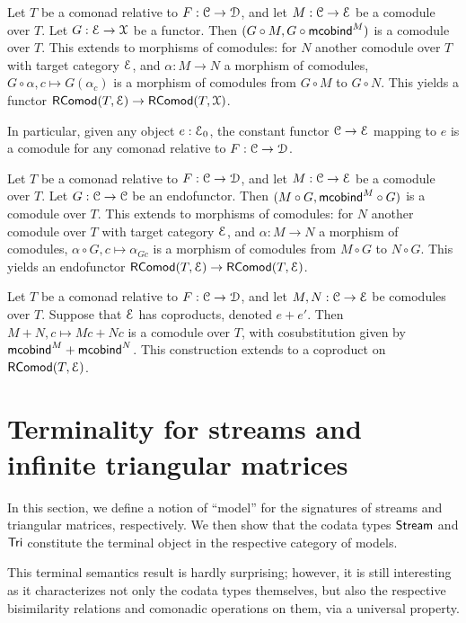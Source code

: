 \documentclass[a4paper,USenglish]{lipics}
\begin{document}
\begin{lem}
Let $T$ be a comonad relative to $F : {\mathcal{C}} \to \mathcal{D}$, and let $M : {\mathcal{C}} \to \mathcal{E}$ be a comodule over $T$.
Let $G : \mathcal{E} \to \mathcal{X}$ be a functor.
Then $(G \circ M, G\circ \mathsf{mcobind}^M)$ is a comodule over $T$.
This extends to morphisms of comodules: for $N$ another comodule over $T$ with target category $\mathcal{E}$, and $\alpha : M \to N$ a morphism of comodules,
$G \circ \alpha, c \mapsto G(\alpha_c)$
is a morphism of comodules from $G \circ M$ to $G \circ N$.
This yields a functor
$\mathsf{RComod}(T,\mathcal{E}) \to \mathsf{RComod}(T,\mathcal{X})$. 
\end{lem}

In particular, given any object $e:\mathcal{E}_0$, the constant functor ${\mathcal{C}}\to\mathcal{E}$ mapping to $e$ is a comodule for any comonad relative to $F:{\mathcal{C}}\to\mathcal{D}$.

\begin{lem}
Let $T$ be a comonad relative to $F : {\mathcal{C}} \to \mathcal{D}$, and let $M : {\mathcal{C}} \to \mathcal{E}$ be a comodule over $T$.
Let $G : {\mathcal{C}} \to {\mathcal{C}}$ be an endofunctor.
Then $(M \circ G, \mathsf{mcobind}^M \circ G)$ is a comodule over $T$.
This extends to morphisms of comodules: for $N$ another comodule over $T$ with target category $\mathcal{E}$, and $\alpha : M \to N$ a morphism of comodules,
$\alpha \circ G, c \mapsto \alpha_{Gc}$
is a morphism of comodules from $M \circ G$ to $N \circ G$.
This yields an endofunctor
$\mathsf{RComod}(T,\mathcal{E}) \to \mathsf{RComod}(T,\mathcal{E})$. 
\end{lem}

\begin{lem}
Let $T$ be a comonad relative to $F : {\mathcal{C}} \to \mathcal{D}$, and let $M, N: {\mathcal{C}} \to \mathcal{E}$ be comodules over $T$.
Suppose that $\mathcal{E}$ has coproducts, denoted $e + e'$.
Then $M + N, c \mapsto M c + N c$ is a comodule over $T$, with cosubstitution given by $\mathsf{mcobind}^M + \mathsf{mcobind}^N$.
This construction extends to a coproduct on $\mathsf{RComod}(T,\mathcal{E})$. 
\end{lem}



\section{Terminality for streams and infinite triangular matrices}\label{sec:coalgebras_for_tri}

In this section, we define a notion of \enquote{model} for the signatures of streams and triangular matrices,
respectively. We then show that the codata types $\mathsf{Stream}$ and $\mathsf{Tri}$ constitute the terminal object in
the respective category of models.


This terminal semantics result is hardly surprising; however, it is still interesting as it characterizes not only the codata types themselves,
 but also the respective bisimilarity relations and comonadic operations on them, via a universal property.
\end{document}
